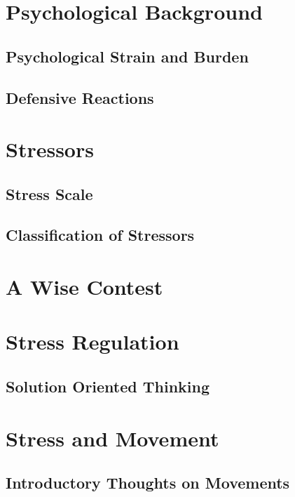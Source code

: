 \documentclass[../main.tex]{subfiles}
\begin{document}
\chapter{Psychological Background}
\section{Psychological Strain and Burden}


\section{Defensive Reactions}



\chapter{Stressors}
\section{Stress Scale}


\section{Classification of Stressors}
% 

\chapter{A Wise Contest}


\chapter{Stress Regulation}
\section{Solution Oriented Thinking}


\chapter{Stress and Movement}
\section{Introductory Thoughts on Movements}

\end{document}
